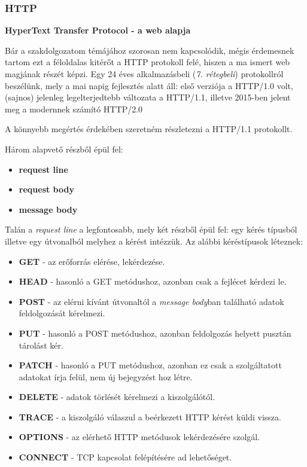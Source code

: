 \subsubsection{HTTP}
\textbf{HyperText Transfer Protocol - a web alapja}

Bár a szakdolgozatom témájához szorosan nem kapcsolódik, mégis érdemesnek tartom ezt a féloldalas kitérőt a HTTP protokoll felé, hiszen a ma ismert web magjának részét képzi. Egy 24 éves alkalmazásbeli (\textit{7. rétegbeli}) protokollról beszélünk, mely a mai napig fejlesztés alatt áll: első verziója a HTTP/1.0 volt, (sajnos) jelenleg legelterjedtebb változata a HTTP/1.1\cite{ripHTTP2}, illetve 2015-ben jelent meg a modernnek számító HTTP/2.0\cite{HTTP2_RFC}

A könnyebb megértés érdekében szeretném részletezni a HTTP/1.1 protokollt.

Három alapvető részből épül fel:
\begin{itemize}
    \item \textbf{request line}
    \item \textbf{request body}
    \item \textbf{message body}
\end{itemize}
Talán a \textit{request line} a legfontosabb, mely két részből épül fel: egy kérés típusból illetve egy útvonalból melyhez a kérést intézzük. Az alábbi kéréstípusok léteznek:
\begin{itemize}
    \item \textbf{GET} - az erőforrás elérése, lekérdezése.
    \item \textbf{HEAD} - hasonló a GET metódushoz, azonban csak a fejlécet kérdezi le.
    \item \textbf{POST} - az elérni kívánt útvonaltól a \textit{message body}ban található adatok feldolgozását kérelmezi.
    \item \textbf{PUT} - hasonló a POST metódushoz, azonban feldolgozás helyett pusztán tárolást kér.
    \item \textbf{PATCH} - hasonló a PUT metódushoz, azonban ez csak a szolgáltatott adatokat írja felül, nem új bejegyzést hoz létre.
    \item \textbf{DELETE} - adatok törlését kérelmezi a kiszolgálótól.
    \item \textbf{TRACE} - a kiszolgáló válaszul a beérkezett HTTP kérést küldi vissza.
    \item \textbf{OPTIONS} - az elérhető HTTP metódusok lekérdezésére szolgál.
    \item \textbf{CONNECT} - TCP kapcsolat felépítésére ad lehetőséget.
\end{itemize}


